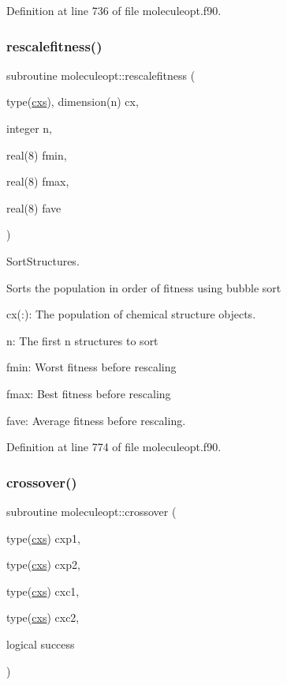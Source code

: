 Definition at line 736 of file moleculeopt.\+f90.

\mbox{\label{namespacemoleculeopt_a8212379663e0215a8c9300ce1674e51f}} 
\subsubsection{\texorpdfstring{rescalefitness()}{rescalefitness()}}
{\footnotesize\ttfamily subroutine moleculeopt\+::rescalefitness (\begin{DoxyParamCaption}\item[{type(\mbox{\hyperlink{structchemstr_1_1cxs}{cxs}}), dimension(n)}]{cx,  }\item[{integer}]{n,  }\item[{real(8)}]{fmin,  }\item[{real(8)}]{fmax,  }\item[{real(8)}]{fave }\end{DoxyParamCaption})}



Sort\+Structures. 

Sorts the population in order of fitness using bubble sort


\begin{DoxyItemize}
\item cx(\+:)\+: The population of chemical structure objects.
\item n\+: The first n structures to sort
\item fmin\+: Worst fitness before rescaling
\item fmax\+: Best fitness before rescaling
\item fave\+: Average fitness before rescaling. 
\end{DoxyItemize}

Definition at line 774 of file moleculeopt.\+f90.

\mbox{\label{namespacemoleculeopt_a5d8b857653669446c74c9cf8ed5c967c}} 
\subsubsection{\texorpdfstring{crossover()}{crossover()}}
{\footnotesize\ttfamily subroutine moleculeopt\+::crossover (\begin{DoxyParamCaption}\item[{type(\mbox{\hyperlink{structchemstr_1_1cxs}{cxs}})}]{cxp1,  }\item[{type(\mbox{\hyperlink{structchemstr_1_1cxs}{cxs}})}]{cxp2,  }\item[{type(\mbox{\hyperlink{structchemstr_1_1cxs}{cxs}})}]{cxc1,  }\item[{type(\mbox{\hyperlink{structchemstr_1_1cxs}{cxs}})}]{cxc2,  }\item[{logical}]{success }\end{DoxyParamCaption})}



